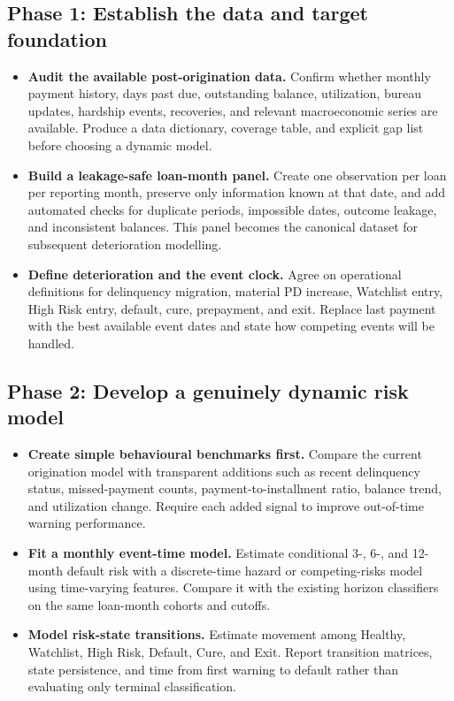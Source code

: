 \documentclass[11pt]{article}
\begin{document}
\subsection*{Phase 1: Establish the data and target foundation}

\begin{itemize}[label=$\square$,leftmargin=2em]
  \item \textbf{Audit the available post-origination data.} Confirm whether monthly
  payment history, days past due, outstanding balance, utilization, bureau updates,
  hardship events, recoveries, and relevant macroeconomic series are available.
  Produce a data dictionary, coverage table, and explicit gap list before choosing
  a dynamic model.

  \item \textbf{Build a leakage-safe loan-month panel.} Create one observation per
  loan per reporting month, preserve only information known at that date, and add
  automated checks for duplicate periods, impossible dates, outcome leakage, and
  inconsistent balances. This panel becomes the canonical dataset for subsequent
  deterioration modelling.

  \item \textbf{Define deterioration and the event clock.} Agree on operational
  definitions for delinquency migration, material PD increase, Watchlist entry,
  High Risk entry, default, cure, prepayment, and exit. Replace last payment with
  the best available event dates and state how competing events will be handled.
\end{itemize}

\subsection*{Phase 2: Develop a genuinely dynamic risk model}

\begin{itemize}[label=$\square$,leftmargin=2em]
  \item \textbf{Create simple behavioural benchmarks first.} Compare the current
  origination model with transparent additions such as recent delinquency status,
  missed-payment counts, payment-to-installment ratio, balance trend, and utilization
  change. Require each added signal to improve out-of-time warning performance.

  \item \textbf{Fit a monthly event-time model.} Estimate conditional 3-, 6-, and
  12-month default risk with a discrete-time hazard or competing-risks model using
  time-varying features. Compare it with the existing horizon classifiers on the
  same loan-month cohorts and cutoffs.

  \item \textbf{Model risk-state transitions.} Estimate movement among Healthy,
  Watchlist, High Risk, Default, Cure, and Exit. Report transition matrices, state
  persistence, and time from first warning to default rather than evaluating only
  terminal classification.
\end{itemize}
\end{document}
